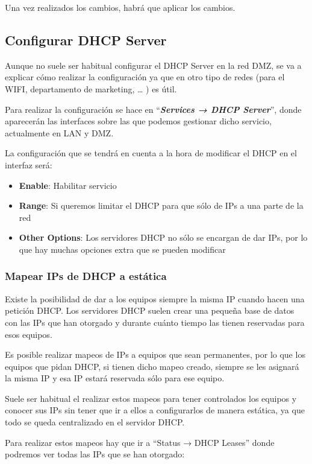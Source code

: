 Una vez realizados los cambios, habrá que aplicar los cambios.


\subsection{Configurar DHCP Server}
Aunque no suele ser habitual configurar el DHCP Server en la red DMZ, se va a explicar cómo realizar la configuración ya que en otro tipo de redes (para el WIFI, departamento de marketing, … ) es útil.

Para realizar la configuración se hace en “\textbf{\textit{Services → DHCP Server}}”, donde aparecerán las interfaces sobre las que podemos gestionar dicho servicio, actualmente en LAN y DMZ.

La configuración que se tendrá en cuenta a la hora de modificar el DHCP en el interfaz será:

\begin{itemize}
    \item \textbf{Enable}: Habilitar servicio
    \item \textbf{Range}: Si queremos limitar el DHCP para que sólo de IPs a una parte de la red
    \item \textbf{Other Options}: Los servidores DHCP no sólo se encargan de dar IPs, por lo que hay muchas opciones extra que se pueden modificar
\end{itemize}

\subsubsection{Mapear IPs de DHCP a estática}
Existe la posibilidad de dar a los equipos siempre la misma IP cuando hacen una petición DHCP. Los servidores DHCP suelen crear una pequeña base de datos con las IPs que han otorgado y durante cuánto tiempo las tienen reservadas para esos equipos.

Es posible realizar mapeos de IPs a equipos que sean permanentes, por lo que los equipos que pidan DHCP, si tienen dicho mapeo creado, siempre se les asignará la misma IP y esa IP estará reservada sólo para ese equipo.

Suele ser habitual el realizar estos mapeos para tener controlados los equipos y conocer sus IPs sin tener que ir a ellos a configurarlos de manera estática, ya que todo se queda centralizado en el servidor DHCP.

Para realizar estos mapeos hay que ir a “Status → DHCP Leases” donde podremos ver todas las IPs que se han otorgado:

